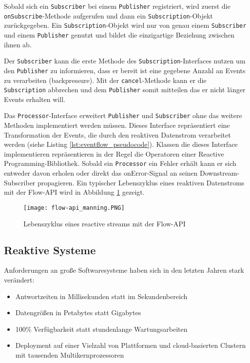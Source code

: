 Sobald sich ein \verb|Subscriber| bei einem \verb|Publisher| registriert, wird zuerst die \verb|onSubscribe|-Methode aufgerufen und dann ein
\verb|Subscription|-Objekt zurückgegeben. Ein \verb|Subscription|-Objekt wird nur von genau einem \verb|Subscriber| und einem \verb|Publisher| genutzt
und bildet die einzigartige Beziehung zwischen ihnen ab.

Der \verb|Subscriber| kann die erste Methode des \verb|Subscription|-Interfaces nutzen um den \verb|Publisher| zu informieren, dass er bereit
ist eine gegebene Anzahl an Events zu verarbeiten (backpressure). Mit der \verb|cancel|-Methode kann er die \verb|Subscription| abbrechen und dem \verb|Publisher|
somit mitteilen das er nicht länger Events erhalten will.
\parencite{JavaSEFlow}

Das \verb|Processor|-Interface erweitert \verb|Publisher| und \verb|Subscriber| ohne das weitere Methoden implementiert werden müssen.
Dieses Interface repräsentiert eine Transformation der Events, die durch den
reaktiven Datenstrom verarbeitet werden (siehe Listing \ref{lst:eventflow_pseudocode}).
Klassen die dieses Interface implementieren repräsentieren in der Regel die Operatoren einer Reactive Programming-Bibliothek.
Sobald ein \verb|Processor| ein Fehler erhält kann er sich entweder davon erholen oder direkt das onError-Signal an seinen
Downstream-Subscriber propagieren. Ein typischer Lebenszyklus eines reaktiven Datenstroms mit der Flow-API wird in
Abbildung \ref{fig:flow-api} gezeigt.
\begin{figure}[h]
	\centering
	\texttt{[image: flow-api\_manning.PNG]}
	\caption{Lebenszyklus eines reactive streams mit der Flow-API \parencite[Kapitel 17,  Figure 17.3]{JavaInAction}}
	\label{fig:flow-api}
\end{figure}
\newpage

\subsection{Reaktive Systeme}
\label{subsection:reaktive_systeme}
Anforderungen an große Softwaresysteme haben sich in den letzten Jahren stark verändert:
\begin{itemize}
	\item Antwortzeiten in Millisekunden statt im Sekundenbereich
	\item Datengrößen in Petabytes statt Gigabytes
	\item 100\% Verfügbarkeit statt stundenlange Wartungsarbeiten
	\item Deployment auf einer Vielzahl von Plattformen und cloud-basierten Clustern mit tausenden Multikernprozessoren
\end{itemize}


